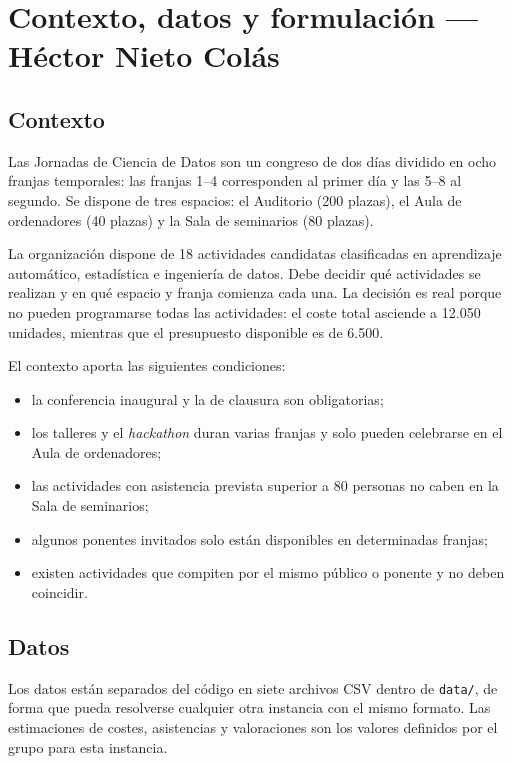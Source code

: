 \section{Contexto, datos y formulación --- Héctor Nieto Colás}

\subsection{Contexto}

Las Jornadas de Ciencia de Datos son un congreso de dos días dividido en ocho
franjas temporales: las franjas 1--4 corresponden al primer día y las 5--8 al
segundo. Se dispone de tres espacios: el Auditorio (200 plazas), el Aula de
ordenadores (40 plazas) y la Sala de seminarios (80 plazas).

La organización dispone de 18 actividades candidatas clasificadas en aprendizaje
automático, estadística e ingeniería de datos. Debe decidir qué actividades se
realizan y en qué espacio y franja comienza cada una. La decisión es real porque
no pueden programarse todas las actividades: el coste total asciende a 12.050
unidades, mientras que el presupuesto disponible es de 6.500.

El contexto aporta las siguientes condiciones:
\begin{itemize}
\item la conferencia inaugural y la de clausura son obligatorias;
\item los talleres y el \emph{hackathon} duran varias franjas y solo pueden
      celebrarse en el Aula de ordenadores;
\item las actividades con asistencia prevista superior a 80 personas no caben
      en la Sala de seminarios;
\item algunos ponentes invitados solo están disponibles en determinadas franjas;
\item existen actividades que compiten por el mismo público o ponente y no deben
      coincidir.
\end{itemize}

\subsection{Datos}

Los datos están separados del código en siete archivos CSV dentro de
\texttt{data/}, de forma que pueda resolverse cualquier otra instancia con el
mismo formato. Las estimaciones de costes, asistencias y valoraciones son los
valores definidos por el grupo para esta instancia.

